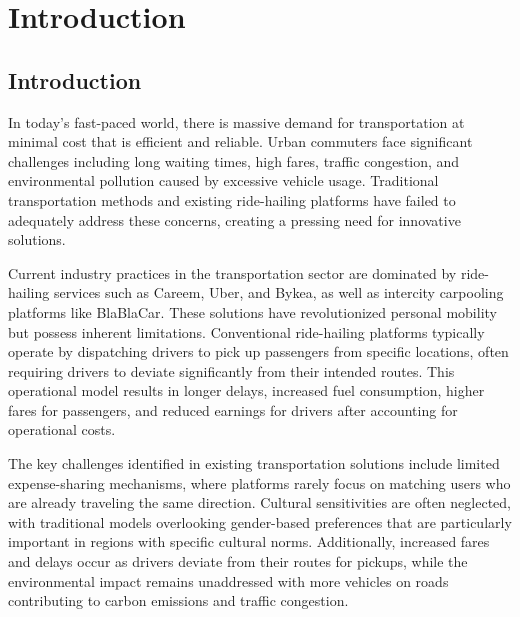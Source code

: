 
\chapter{Introduction}


\section{Introduction}

In today's fast-paced world, there is massive demand for transportation at minimal cost that is efficient and reliable. Urban commuters face significant challenges including long waiting times, high fares, traffic congestion, and environmental pollution caused by excessive vehicle usage. Traditional transportation methods and existing ride-hailing platforms have failed to adequately address these concerns, creating a pressing need for innovative solutions.

Current industry practices in the transportation sector are dominated by ride-hailing services such as Careem, Uber, and Bykea, as well as intercity carpooling platforms like BlaBlaCar. These solutions have revolutionized personal mobility but possess inherent limitations. Conventional ride-hailing platforms typically operate by dispatching drivers to pick up passengers from specific locations, often requiring drivers to deviate significantly from their intended routes. This operational model results in longer delays, increased fuel consumption, higher fares for passengers, and reduced earnings for drivers after accounting for operational costs.

The key challenges identified in existing transportation solutions include limited expense-sharing mechanisms, where platforms rarely focus on matching users who are already traveling the same direction. Cultural sensitivities are often neglected, with traditional models overlooking gender-based preferences that are particularly important in regions with specific cultural norms. Additionally, increased fares and delays occur as drivers deviate from their routes for pickups, while the environmental impact remains unaddressed with more vehicles on roads contributing to carbon emissions and traffic congestion.

